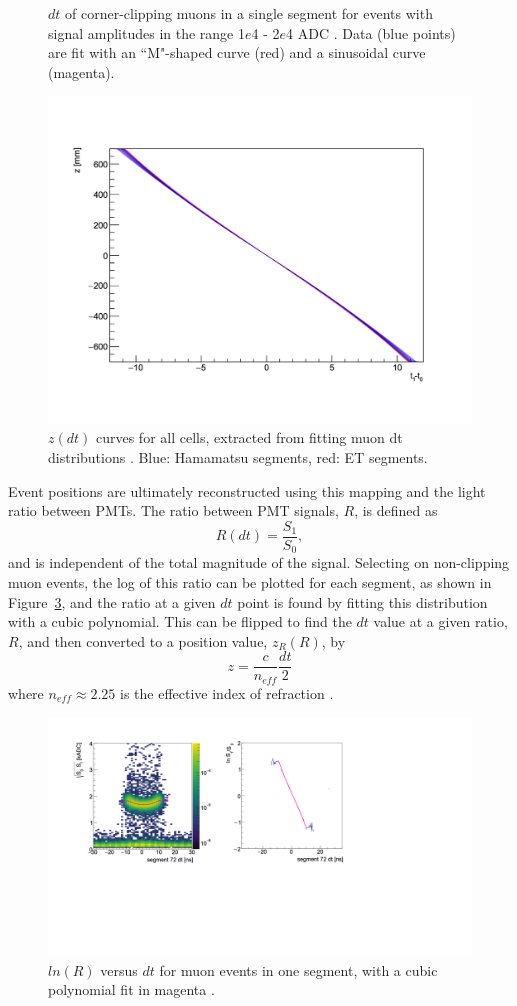 \begin{figure}[h]
\begin{minipage}[h]{0.5\linewidth}
		\caption[Muon $dt$ for a single segment]{$dt$ of corner-clipping muons in a single segment for events with signal amplitudes in the range  1$e$4 -  2$e$4 ADC \cite{MM:2314}. Data (blue points) are fit with an ``M"-shaped curve (red) and a sinusoidal curve (magenta).}
		\label{fig:hobbesfit}
	\end{minipage}
\end{figure}

\begin{figure}[H]
	\centering
	\includegraphics[width=0.45\linewidth]{tex/5-analysis-images/z_vs_dt}
	\caption[$z(dt)$ curves for all cells]{$z(dt)$ curves for all cells, extracted from fitting muon dt distributions \cite{MM:2314}. Blue: Hamamatsu segments, red: ET segments.}
	\label{fig:zvsdt}
\end{figure}

Event positions are ultimately reconstructed using this mapping and the light ratio between PMTs.  
The ratio between PMT signals, $R$, is defined as
\begin{equation}
	R(dt) = \frac{S_1}{S_0},
\end{equation}
and is independent of the total magnitude of the signal.
Selecting on non-clipping muon events, the log of this ratio can be plotted for each segment, as shown in Figure~\ref{fig:rvsdt}, and the ratio at a given $dt$ point is found by fitting this distribution with a cubic polynomial. 
This can be flipped to find the $dt$ value at a given ratio, $R$, and then converted to a position value, $z_R(R)$, by
\begin{equation}
	z = \frac{c}{n_{eff}}\frac{dt}{2}
	\label{eq:zdt}
\end{equation}
where $n_{eff} \approx 2.25$ is the effective index of refraction \cite{MM:2314}.

\begin{figure}[!b]
	\centering
	\includegraphics[width=0.5\linewidth]{tex/5-analysis-images/R_vs_dt}
	\caption[]{$ln(R)$ versus $dt$ for muon events in one segment, with a cubic polynomial fit in magenta \cite{MM:2314}.}
	\label{fig:rvsdt}
\end{figure}

